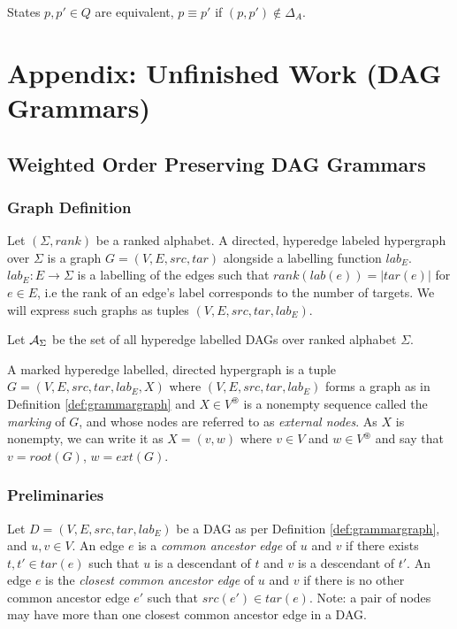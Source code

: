 \documentclass[11pt]{article}
\begin{document}
\begin{definition}
  States $p,p' \in Q$ are equivalent, $p\equiv p'$ if $(p,p') \notin \Delta_A$.
\end{definition}

\section{Appendix: Unfinished Work (DAG Grammars)}
\subsection{Weighted Order Preserving DAG Grammars}
\subsubsection{Graph Definition}
\begin{definition}
  \label{def:grammargraph}
  Let $(\Sigma, rank)$ be a ranked alphabet. A directed, hyperedge labeled
  hypergraph over $\Sigma$ is a graph $G = (V, E, src, tar)$ alongside a
  labelling function $lab_E$. $lab_E: E \rightarrow \Sigma$ is a labelling of
  the edges such that $rank(lab(e)) = |tar(e)|$ for $e \in E$, i.e the rank of
  an edge's label corresponds to the number of targets.  We will express such
  graphs as tuples $(V, E, src, tar, lab_E)$.
\end{definition}
  
Let $\mathcal{A}_\Sigma$ be the set of all hyperedge labelled DAGs over ranked
alphabet $\Sigma$.

\begin{definition}
  \label{def:markedhypergraph}
  A marked hyperedge labelled, directed hypergraph is a tuple $G =
  (V,E,src,tar,lab_E,X)$ where $(V,E,src,tar,lab_E)$ forms a graph as in
  Definition \ref{def:grammargraph} and $X \in V^\circledast$ is a nonempty
  sequence called the \textit{marking} of $G$, and whose nodes are referred to
  as \textit{external nodes}. As $X$ is nonempty, we can write it as $X = (v,w)$
  where $v \in V$ and $w \in V^\circledast$ and say that $v = root(G)$, $w =
  ext(G)$. 
\end{definition}
    

\subsubsection{Preliminaries}
Let $D = (V,E,src,tar,lab_E)$ be a DAG as per Definition \ref{def:grammargraph},
and $u,v \in V$. An edge $e$ is a \textit{common ancestor edge} of $u$ and $v$
if there exists $t, t' \in tar(e)$ such that $u$ is a descendant of $t$ and $v$
is a descendant of $t'$. An edge $e$ is the \textit{closest common ancestor
edge} of $u$ and $v$ if there is no other common ancestor edge $e'$ such that
$src(e') \in tar(e)$. Note: a pair of nodes may have more than one closest
common ancestor edge in a DAG. 
\end{document}
